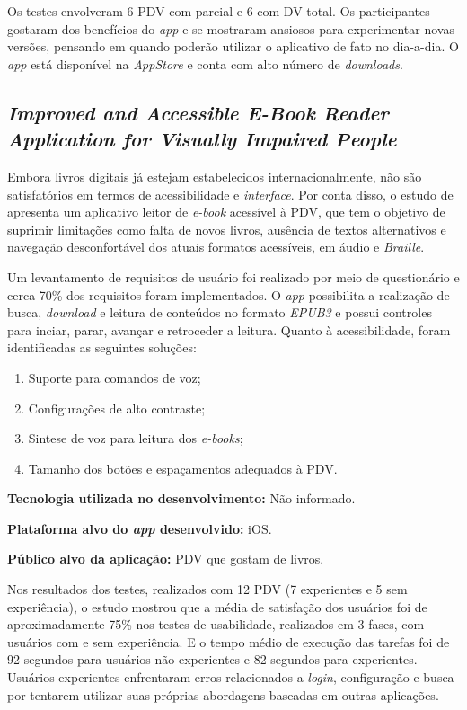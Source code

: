 Os testes envolveram 6 PDV com parcial e 6 com DV total.
Os participantes gostaram dos benefícios do \emph{app} e se mostraram ansiosos para experimentar novas versões, pensando em quando poderão utilizar o aplicativo de fato no dia-a-dia.
O \emph{app} está disponível na \emph{AppStore} e conta com alto número de \emph{downloads}.

\subsection{\emph{Improved and Accessible E-Book Reader Application for Visually Impaired People}}

Embora livros digitais já estejam estabelecidos internacionalmente, não são satisfatórios em termos de acessibilidade e \emph{interface}.
Por conta disso, o estudo de  apresenta um aplicativo leitor de \emph{e-book} acessível à PDV, que tem o objetivo de suprimir limitações como falta de novos livros, ausência de textos alternativos e navegação desconfortável dos atuais formatos acessíveis, em áudio e \emph{Braille}.

Um levantamento de requisitos de usuário foi realizado por meio de questionário e cerca 70\% dos requisitos foram implementados.
O \emph{app} possibilita a realização de busca, \emph{download} e leitura de conteúdos no formato \emph{EPUB3} e possui controles para inciar, parar, avançar e retroceder a leitura.
Quanto à acessibilidade, foram identificadas as seguintes soluções:

\begin{enumerate}
    \item Suporte para comandos de voz;
    \item Configurações de alto contraste;
    \item Sintese de voz para leitura dos \emph{e-books};
    \item Tamanho dos botões e espaçamentos adequados à PDV\@.
\end{enumerate}

\textbf{Tecnologia utilizada no desenvolvimento:} Não informado.

\textbf{Plataforma alvo do \emph{app} desenvolvido:} iOS.

\textbf{Público alvo da aplicação:} PDV que gostam de livros\@.

Nos resultados dos testes, realizados com 12 PDV (7 experientes e 5 sem experiência), o estudo mostrou que a média de satisfação dos usuários foi de aproximadamente 75\% nos testes de usabilidade, realizados em 3 fases, com usuários com e sem experiência.
E o tempo médio de execução das tarefas foi de 92 segundos para usuários não experientes e 82 segundos para experientes.
Usuários experientes enfrentaram erros relacionados a \emph{login}, configuração e busca por tentarem utilizar suas próprias abordagens baseadas em outras aplicações.

